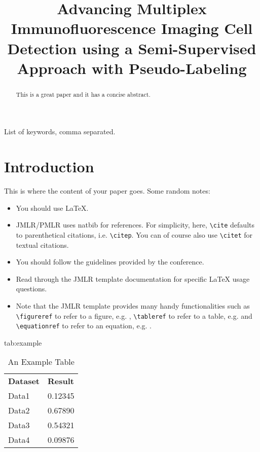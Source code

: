 \documentclass{midl} %
\title[Semi-Supervised Cell Detection in Immunofluorescence Imaging]{Advancing Multiplex Immunofluorescence Imaging Cell Detection using a Semi-Supervised Approach with Pseudo-Labeling}
\begin{document}
\maketitle

\begin{abstract}
This is a great paper and it has a concise abstract.
\end{abstract}

\begin{keywords}
List of keywords, comma separated.
\end{keywords}

\section{Introduction}

This is where the content of your paper goes.  Some random notes:
\begin{itemize}
\item You should use \LaTeX \cite{Lamport:Book:1989}.
\item JMLR/PMLR uses natbib for references. For simplicity, here, \verb|\cite|  defaults to
  parenthetical citations, i.e. \verb|\citep|. You can of course also
  use \verb|\citet| for textual citations.
\item You should follow the guidelines provided by the conference.
\item Read through the JMLR template documentation for specific \LaTeX
  usage questions.
\item Note that the JMLR template provides many handy functionalities
such as \verb|\figureref| to refer to a figure,
e.g. ,  \verb|\tableref| to refer to a table,
e.g.  and \verb|\equationref| to refer to an equation,
e.g. .
\end{itemize}

\begin{table}[htbp]
\floatconts
  {tab:example}%
  {\caption{An Example Table}}%
  {\begin{tabular}{ll}
  \bfseries Dataset & \bfseries Result\\
  Data1 & 0.12345\\
  Data2 & 0.67890\\
  Data3 & 0.54321\\
  Data4 & 0.09876
  \end{tabular}}
\end{table}
\end{document}

